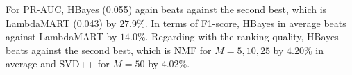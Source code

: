 \begin{table}[htb]
\label{NDCG_cmp_music}
\begin{center}
\caption{NDCG on Last.fm recommendations}
\end{center}
\end{table}

For PR-AUC, HBayes (0.055) again beats against the second best, which is LambdaMART (0.043) by $27.9\%$.  In terms of F1-score, HBayes in average beats against LambdaMART by $14.0\%$.  Regarding with the ranking quality, HBayes beats against the second best, which is NMF  for $M=5,10,25$ by $4.20\%$ in average and SVD++ for $M=50$ by $4.02\%$.  









